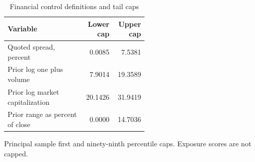 \begin{table}[htbp]
\centering
\caption{Financial control definitions and tail caps}
\label{tab:controls}
\begin{minipage}{\linewidth}
\small
\setlength{\tabcolsep}{4pt}
\begingroup\centering
\begin{tabular}{p{0.55\linewidth}rr}
\toprule
Variable & Lower cap & Upper cap \\
\midrule
Quoted spread, percent & 0.0085 & 7.5381 \\
Prior log one plus volume & 7.9014 & 19.3589 \\
Prior log market capitalization & 20.1426 & 31.9419 \\
Prior range as percent of close & 0.0000 & 14.7036 \\
\bottomrule
\end{tabular}\par\endgroup
\par\vspace{0.5em}\footnotesize Principal sample first and ninety-ninth percentile caps. Exposure scores are not capped.
\end{minipage}
\end{table}
